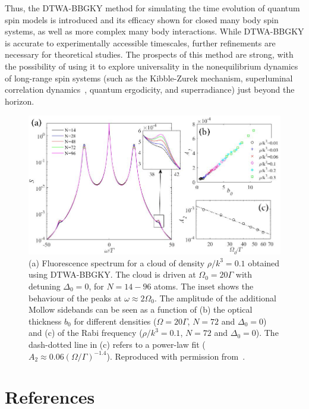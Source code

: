 \documentclass[extendedabs]{bmvc2k}
\begin{document}
Thus, the DTWA-BBGKY method for simulating the time evolution of quantum spin models is introduced and its efficacy shown for closed many body spin systems, as well as more complex many body interactions. While DTWA-BBGKY is accurate to experimentally accessible timescales, further refinements are necessary for theoretical studies. The prospects of this method are strong, with the possibility of using it to explore universality in the nonequilibrium dynamics of long-range spin systems (such as the Kibble-Zurek mechanism, superluminal correlation dynamics~\cite{Eisert13}, quantum ergodicity, and superradiance) just beyond the horizon.
\begin{figure}
\centering
\includegraphics[width=1\linewidth]{./images/fig4.png}
\caption{\label{fig:SpecBabies} (a) Fluorescence spectrum for a cloud of density $\rho/k^3=0.1$ obtained using DTWA-BBGKY. The cloud is driven at $\Omega_0=20\Gamma$ with detuning $\Delta_0=0$, for $N=14-96$ atoms. The inset shows the behaviour of the peaks at $\omega\approx2\Omega_0$. The amplitude of the additional Mollow sidebands can be seen as a function of (b) the optical thickness $b_0$ for different densities ($\Omega=20\Gamma$, $N=72$ and $\Delta_0=0$) and (c) of the Rabi frequency ($\rho/k^3=0.1$, $N=72$ and $\Delta_0=0$). The dash-dotted line in (c) refers to a power-law fit ($A_2\approx 0.06(\Omega/\Gamma)^{-1.4}$). Reproduced with permission from~\cite{Pucci17}.}
\end{figure}
\section*{References}

\end{document}

